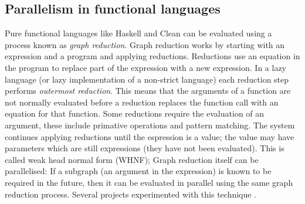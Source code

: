 
\subsection{Parallelism in functional languages}
\label{sec:intro_par_func}


Pure functional languages like Haskell and Clean can be evaluated using a
process known as \emph{graph reduction}.
Graph reduction works by starting with an expression and a program and
applying reductions.
Reductions use an equation in the program to replace part of the expression
with a new expression.
In a lazy language (or lazy implementation of a non-strict language) 
each reduction step performs \emph{outermost reduction}.
This means that the arguments of a function are not normally evaluated
before a reduction replaces the function call with an equation for that
function.
Some reductions require the evaluation of an argument,
these include primative operations and pattern matching.
The system continues applying reductions until the espression is 
a value;
the value may have parameters which are still expressions (they have not
been evaluated).
This is called weak head normal form (WHNF);
Graph reduction itself can be parallelised:
If a subgraph (an argument in the expression) is known to be required in the
future,
then it can be evaluated in parallel using the same graph reduction process.
Several projects experimented with this technique
\citep{augustsson:1989:parallel-graph-reduction,burn:1989:parallel-reduction-machine,peyton-jones:1989:parallel-graph-reduction}.

